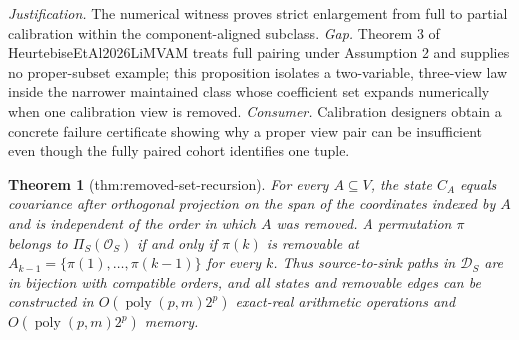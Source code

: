 \documentclass{article}
\newtheorem{theorem}{Theorem}
\begin{document}
\par\smallskip\noindent \textit{Justification.} The numerical witness proves strict enlargement from full to partial calibration within the component-aligned subclass. \textit{Gap.} Theorem 3 of HeurtebiseEtAl2026LiMVAM treats full pairing under Assumption 2 and supplies no proper-subset example; this proposition isolates a two-variable, three-view law inside the narrower maintained class whose coefficient set expands numerically when one calibration view is removed. \textit{Consumer.} Calibration designers obtain a concrete failure certificate showing why a proper view pair can be insufficient even though the fully paired cohort identifies one tuple.

\begin{theorem}[thm:removed-set-recursion]\label{thm:removed-set-recursion}
For every \(A\subseteq V\), the state \(C_A\) equals covariance after orthogonal projection on the span of the coordinates indexed by \(A\) and is independent of the order in which \(A\) was removed. A permutation \(\pi\) belongs to \(\Pi_S(\mathcal O_S)\) if and only if \(\pi(k)\) is removable at \(A_{k-1}=\{\pi(1),\ldots,\pi(k-1)\}\) for every \(k\). Thus source-to-sink paths in \(\mathcal D_S\) are in bijection with compatible orders, and all states and removable edges can be constructed in \(O(\operatorname{poly}(p,m)2^p)\) exact-real arithmetic operations and \(O(\operatorname{poly}(p,m)2^p)\) memory.
\end{theorem}
\end{document}
